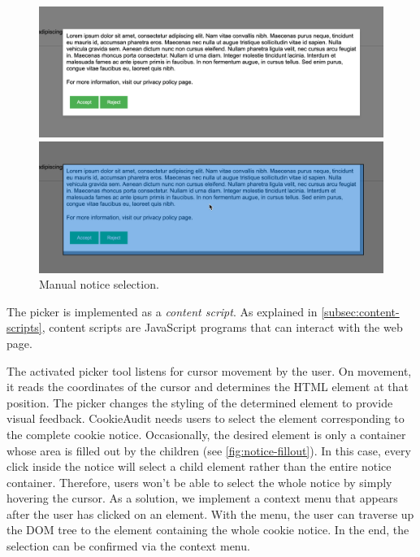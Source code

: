 \begin{figure}
	\centering
	\begin{minipage}{0.48\textwidth}
		\centering
		\includegraphics[width=1.0\linewidth]{media/screenshot_unselected.png}
	\end{minipage}\hfill
	\begin{minipage}{0.48\textwidth}
		\centering
		\includegraphics[width=1.0\linewidth]{media/screenshot_selected.png}      
	\end{minipage}
	\caption{Manual notice selection.}
	\label{fig:screenshot-selection}
\end{figure}

The picker is implemented as a \emph{content script}. 
As explained in \cref{subsec:content-scripts}, content scripts are JavaScript programs that can interact with the web page.

The activated picker tool listens for cursor movement by the user. 
On movement, it reads the coordinates of the cursor and determines the HTML element at that position.
The picker changes the styling of the determined element to provide visual feedback.
CookieAudit needs users to select the element corresponding to the complete cookie notice. 
Occasionally, the desired element is only a container whose area is filled out by the children (see \cref{fig:notice-fillout}).
In this case, every click inside the notice will select a child element rather than the entire notice container. 
Therefore, users won't be able to select the whole notice by simply hovering the cursor.
As a solution, we implement a context menu that appears after the user has clicked on an element.
With the menu, the user can traverse up the DOM tree to the element containing the whole cookie notice.
In the end, the selection can be confirmed via the context menu.


